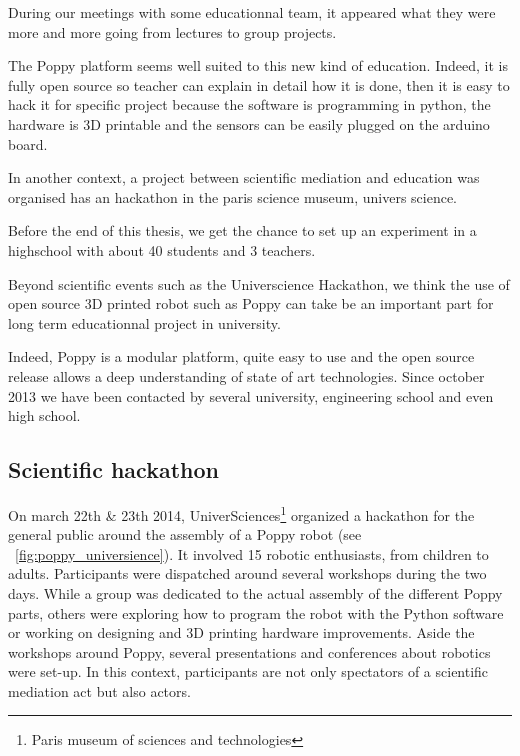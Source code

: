 During our meetings with some educationnal team, it appeared what they were more and more going from lectures to
group projects.


The Poppy platform seems well suited to this new kind of education. Indeed, it is fully open source so teacher can explain in detail how it is done, then it is easy to hack it for specific project because the software is programming in python, the hardware is 3D printable and the sensors can be easily plugged on the arduino board.

In another context, a project between scientific mediation and education was organised has an hackathon in the paris science museum, univers science.

Before the end of this thesis, we get the chance to set up an experiment in a highschool with about 40 students and 3 teachers.



Beyond scientific events such as the Universcience Hackathon, we think the use of open source 3D printed robot such as Poppy can take be an important part for long term educationnal project in university.

Indeed, Poppy is a modular platform, quite easy to use and the open source release allows a deep understanding of state of art technologies. Since october 2013 we have been contacted by several university, engineering school and even high school.


\subsection{Scientific hackathon} %

On march 22th \& 23th 2014, UniverSciences\footnote{Paris museum of sciences and technologies} organized a hackathon for the general public around the assembly of a Poppy robot (see \figurename~\ref{fig:poppy_universience}). It involved 15 robotic enthusiasts, from children to adults. Participants were dispatched around several workshops during the two days. While a group was dedicated to the actual assembly of the different Poppy parts, others were exploring how to program the robot with the Python software or working on designing and 3D printing hardware improvements.  Aside the workshops around Poppy, several presentations and conferences about robotics were set-up. In this context, participants are not only spectators of a scientific mediation act but also actors.

